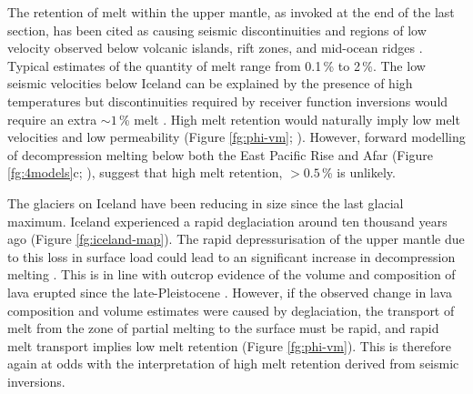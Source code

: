 The retention of melt within the upper mantle, as invoked at the end of the last section, has been cited as causing seismic discontinuities and regions of low velocity observed below volcanic islands, rift zones, and mid-ocean ridges \citep[e.g.][]{forsyth-etal-1998,harmon-etal-2009,rychert-etal-2012,rychert-etal-2014}. Typical estimates of the quantity of melt range from 0.1\,\% to 2\,\%. The low seismic velocities below Iceland can be explained by the presence of high temperatures but discontinuities required by receiver function inversions would require an extra $\sim 1$\,\% melt \citep{rychert-etal-2018}. High melt retention would naturally imply low melt velocities and low permeability (Figure \ref{fg:phi-vm}; \citealp{weatherley-2016,franken-etal-2020}). However, forward modelling of decompression melting below both the East Pacific Rise and Afar (Figure \ref{fg:4models}c; \citealp{goes-etal-2012,armitage-etal-2015}), suggest that high melt retention, $>0.5$\,\% is unlikely. 

The glaciers on Iceland have been reducing in size since the last glacial maximum. Iceland experienced a rapid deglaciation around ten thousand years ago (Figure \ref{fg:iceland-map}). The rapid depressurisation of the upper mantle due to this loss in surface load could lead to an significant increase in decompression melting \citep{jull-1996}. This is in line with outcrop evidence of the volume and composition of lava erupted since the late-Pleistocene \citep{maclennan-etal-2002,sinton-etal-2005,eksinchol-etal-2019}. However, if the observed change in lava composition and volume estimates were caused by deglaciation, the transport of melt from the zone of partial melting to the surface must be rapid, and rapid melt transport implies low melt retention (Figure \ref{fg:phi-vm}). This is therefore again at odds with the interpretation of high melt retention derived from seismic inversions.

